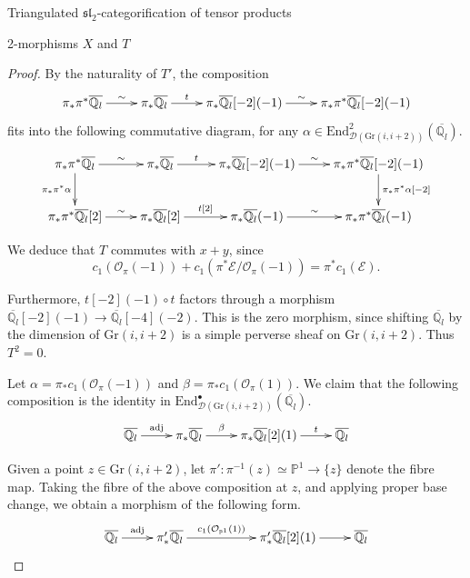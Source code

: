 \documentclass[12pt]{amsart}
\theoremstyle{definition}
\theoremstyle{remark}
\theoremstyle{remark}
\begin{document}
\begin{section}{Triangulated $\mathfrak{sl}_{2}$-categorification of tensor products}
\begin{subsection}{2-morphisms $X$ and $T$}
\begin{proof} By the naturality of $T'$, the composition \[ \xymatrix{ \pi_{*} \pi^{*} \overline{\mathbb{Q}_{l}} \ar[r]^-{\sim} & \pi_{*}\overline{\mathbb{Q}_{l}} \ar[r]^-{t} & \pi_{*} \overline{\mathbb{Q}_{l}}[-2](-1) \ar[r]^-{\sim} & \pi_{*}\pi^{*}\overline{\mathbb{Q}_{l}}[-2](-1)} \] fits into the following commutative diagram, for any $\alpha \in \text{End}^{2}_{\mathcal{D}(\text{Gr}(i,i+2))}(\overline{\mathbb{Q}_{l}})$. \[ \xymatrix{ \pi_{*} \pi^{*} \overline{\mathbb{Q}_{l}} \ar[d]_-{\pi_{*}\pi^{*}\alpha} \ar[r]^-{\sim} & \pi_{*}\overline{\mathbb{Q}_{l}} \ar[r]^-{t} & \pi_{*} \overline{\mathbb{Q}_{l}}[-2](-1) \ar[r]^-{\sim} & \pi_{*}\pi^{*}\overline{\mathbb{Q}_{l}}[-2](-1) \ar[d]^-{\pi_{*}\pi^{*}\alpha [-2]} \\ \pi_{*} \pi^{*} \overline{\mathbb{Q}_{l}}[2] \ar[r]^-{\sim} & \pi_{*}\overline{\mathbb{Q}_{l}}[2] \ar[r]^-{t[2]} & \pi_{*} \overline{\mathbb{Q}_{l}}(-1) \ar[r]^-{\sim} & \pi_{*}\pi^{*}\overline{\mathbb{Q}_{l}}(-1) }\] 

We deduce that $T$ commutes with $x+y$, since \[ c_{1}(\mathcal{O}_{\pi}(-1)) + c_{1}(\pi^{*}\mathscr{E} / \mathcal{O}_{\pi}(-1)) = \pi^{*}c_{1}(\mathscr{E}) .\] 

Furthermore, $t[-2](-1) \circ t$ factors through a morphism $\overline{\mathbb{Q}_{l}}[-2](-1) \rightarrow \overline{\mathbb{Q}_{l}}[-4](-2)$. This is the zero morphism, since shifting $\overline{\mathbb{Q}_{l}}$ by the dimension of $\text{Gr}(i,i+2)$ is a simple perverse sheaf on $\text{Gr}(i,i+2)$. Thus $T^{2} = 0$.

Let $\alpha = \pi_{*}c_{1}(\mathcal{O}_{\pi}(-1))$ and $\beta = \pi_{*}c_{1}(\mathcal{O}_{\pi}(1))$. We claim that the following composition is the identity in $\text{End}^{\bullet}_{\mathcal{D}(\text{Gr}(i,i+2))}(\overline{\mathbb{Q}_{l}})$. \[ \xymatrix{ \overline{\mathbb{Q}_{l}} \ar[r]^-{\text{adj}} & \pi_{*} \overline{\mathbb{Q}_{l}} \ar[r]^-{\beta} & \pi_{*} \overline{\mathbb{Q}_{l}}[2](1) \ar[r]^-{t} & \overline{\mathbb{Q}_{l}} } \] 

Given a point $z \in \text{Gr}(i,i+2)$, let $\pi' \colon \pi^{-1}(z) \simeq \mathbb{P}^{1} \rightarrow \{z\}$ denote the fibre map. Taking the fibre of the above composition at $z$, and applying proper base change, we obtain a morphism of the following form. \[ \xymatrix{ \overline{\mathbb{Q}_{l}} \ar[r]^-{\text{adj}} & \pi'_{*} \overline{\mathbb{Q}_{l}} \ar[rr]^-{c_{1}(\mathcal{O}_{\mathbb{P}^{1}}(1))} && \pi'_{*} \overline{\mathbb{Q}_{l}}[2](1) \ar[r] & \overline{\mathbb{Q}_{l}} } \]  


\end{proof}
\end{subsection}
\end{section}
\end{document}
